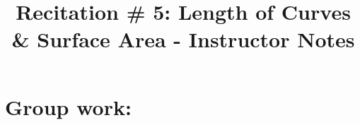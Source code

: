 \documentclass[handout,instructornotes]{ximera}
\title{Recitation \# 5:  Length of Curves \& Surface Area - Instructor Notes}
\begin{document}
\begin{abstract}		\end{abstract}
\maketitle



\begin{comment}
\section{Warm up:}

	\begin{freeResponse}
	
	\end{freeResponse}
	
\begin{instructorNotes}

\end{instructorNotes}
\end{comment}







\section{Group work:}



\end{document}
